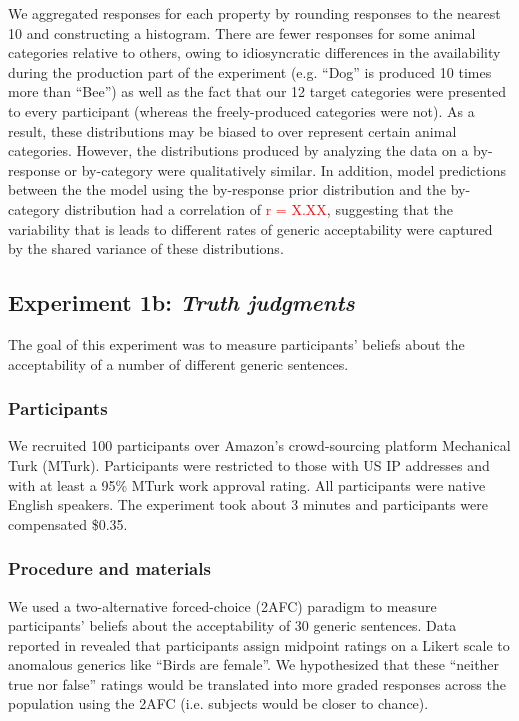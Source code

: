 \documentclass[10pt,letterpaper]{article}
\newcommand{\red}[1]{\textcolor{Red}{#1}}
\begin{document}
We aggregated responses for each property by rounding responses to the nearest 10 and constructing a histogram. There are fewer responses for some animal categories relative to others, owing to idiosyncratic differences in the availability during the production part of the experiment (e.g. ``Dog'' is produced 10 times more than ``Bee'') as well as the fact that our 12 target categories were presented to every participant (whereas the freely-produced categories were not). As a result, these distributions may be biased to over represent certain animal categories. However, the distributions produced by analyzing the data on a by-response or by-category were qualitatively similar. In addition, model predictions between the the model using the by-response prior distribution and the by-category distribution had a correlation of \red{r = X.XX}, suggesting that the variability that is leads to different rates of generic acceptability were captured by the shared variance of these distributions. 


\subsection{Experiment 1b: \emph{Truth judgments}}

The goal of this experiment was to measure participants' beliefs about the acceptability of a number of different generic sentences. 


\subsubsection{Participants}

We recruited 100 participants over Amazon's crowd-sourcing platform Mechanical Turk (MTurk).  Participants were restricted to those with US IP addresses and with at least a 95\% MTurk work approval rating. All participants were native English speakers. The experiment took about 3 minutes and participants were compensated \$0.35.

\subsubsection{Procedure and materials}

We used a two-alternative forced-choice (2AFC) paradigm to measure participants' beliefs about the acceptability of 30 generic sentences. 
Data reported in  revealed that participants assign midpoint ratings on a Likert scale to anomalous generics like ``Birds are female''. 
We hypothesized that these ``neither true nor false'' ratings would be translated into more graded responses across the population using the 2AFC (i.e. subjects would be closer to chance).
\end{document}
